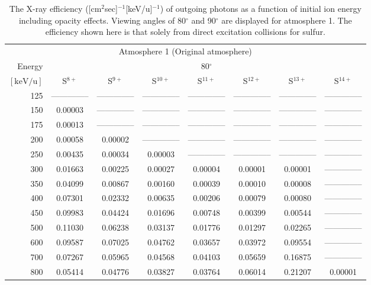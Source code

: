 \begin{table}[ht]
    \centering
    \caption{The X-ray efficiency ([cm$^2$sec]$^{-1}$[keV/u]$^{-1}$) of outgoing photons as a function of initial ion energy including opacity effects. Viewing angles of 80$^\circ$ and 90$^\circ$ are displayed for atmosphere 1. The efficiency shown here is that solely from direct excitation collisions for sulfur.}
    \begin{tabular}{r|c|c|c|c|c|c|c}
    \multicolumn{8}{c}{Atmosphere 1 (Original atmosphere)} \\ \cline{2-8}
    Energy & \multicolumn{7}{c}{80$^\circ$} \\ \cline{2-8}
    $\mathrm{[keV/u]}$ & S$^{8+}$ & S$^{9+}$ & S$^{10+}$ & S$^{11+}$ & S$^{12+}$ & S$^{13+}$ & S$^{14+}$ \\ \cline{1-8}
      125 & -------------- & -------------- & -------------- & -------------- & -------------- & -------------- & -------------- \\
      150 & 0.00003 & -------------- & -------------- & -------------- & -------------- & -------------- & -------------- \\
      175 & 0.00013 & -------------- & -------------- & -------------- & -------------- & -------------- & -------------- \\
      200 & 0.00058 & 0.00002 & -------------- & -------------- & -------------- & -------------- & -------------- \\
      250 & 0.00435 & 0.00034 & 0.00003 & -------------- & -------------- & -------------- & -------------- \\
      300 & 0.01663 & 0.00225 & 0.00027 & 0.00004 & 0.00001 & 0.00001 & -------------- \\
      350 & 0.04099 & 0.00867 & 0.00160 & 0.00039 & 0.00010 & 0.00008 & -------------- \\
      400 & 0.07301 & 0.02332 & 0.00635 & 0.00206 & 0.00079 & 0.00080 & -------------- \\
      450 & 0.09983 & 0.04424 & 0.01696 & 0.00748 & 0.00399 & 0.00544 & -------------- \\
      500 & 0.11030 & 0.06238 & 0.03137 & 0.01776 & 0.01297 & 0.02265 & -------------- \\
      600 & 0.09587 & 0.07025 & 0.04762 & 0.03657 & 0.03972 & 0.09554 & -------------- \\
      700 & 0.07267 & 0.05965 & 0.04568 & 0.04103 & 0.05659 & 0.16875 & -------------- \\
      800 & 0.05414 & 0.04776 & 0.03827 & 0.03764 & 0.06014 & 0.21207 & 0.00001 \\

\end{tabular}
\end{table}
